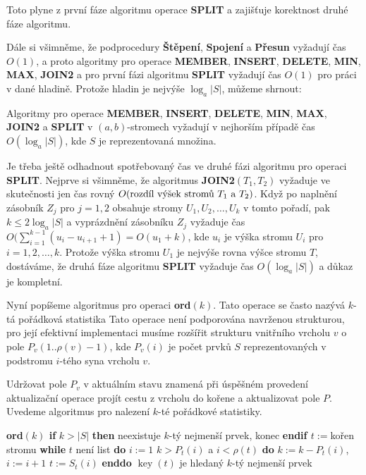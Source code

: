 \documentclass[a4paper,12pt]{article}
\DeclareMathOperator*{\key}{key}
\begin{document}
Toto plyne z první fáze algoritmu operace {\bf SPLIT} a zajišťuje 
korektnost druhé fáze algoritmu. 

Dále si všimněme, že podprocedury {\bf Štěpení}, {\bf Spojení} a {\bf Pře\-sun }
vyžadují čas $O(1)$, a proto algoritmy pro operace {\bf MEMBER}, 
{\bf INSERT}, {\bf DELETE}, {\bf MIN}, {\bf MAX}, {\bf JOIN2} a pro první fázi algoritmu 
{\bf SPLIT} vyžadují čas $O(1)$ pro práci v dané hladině.  Protože 
hladin je nejvýše $\log_a|S|$, můžeme shrnout: 

Algoritmy pro operace {\bf MEMBER}, {\bf INSERT}, 
{\bf DE\-LETE}, {\bf MIN}, {\bf MAX}, {\bf JOIN2} a {\bf SPLIT} v $
(a,b)$-stromech vy\-žadují 
v nejhorším případě čas $O(\log_a|S|)$, kde $
S$ je 
re\-pre\-zen\-tovaná množina.  
\endproclaim

Je třeba ještě odhadnout spotřebovaný čas ve druhé fázi 
algoritmu pro operaci {\bf SPLIT}. Nejprve si všimněme, že 
algoritmus {\bf JOIN2$(T_1,T_2)$} vyžaduje ve skutečnosti jen čas 
rovný 
$O(\text{\rm rozdíl výšek stromů }T_1\text{\rm \ a }
T_2)$. Když po naplnění 
zásobník $Z_j$ pro $j=1,2$ obsahuje stromy $U_1,U_2,\dots,U_
k$ v tomto 
pořadí, pak $k\le 2\log_a|S|$ a vyprázdnění zásobníku $
Z_j$ 
vyžaduje 
čas $O(\sum_{i=1}^{k-1}(u_i-u_{i+1}+1)=O(u_1+k)$, kde $u_i$ je výška stromu $
U_i$ pro 
$i=1,2,\dots,k$. Protože výška stromu $U_1$ je nejvýše rovna výšce 
stromu $T$, dostáváme, že druhá fáze algoritmu {\bf SPLIT} vyžaduje 
čas $O(\log_a|S|)$ a důkaz je kompletní. 

Nyní popíšeme algoritmus pro operaci {\bf ord$
(k)$}. Tato 
operace se často nazývá $k$-tá pořádko\-vá statistika
Tato operace není podporována navrženou 
strukturou, pro její efektivní implementaci musíme 
rozšířit strukturu vnitřního vrcholu $v$ o pole\newline 
$P_v(1..\rho (v)-1)$, kde $P_v(i)$ je počet prvků $S$ reprezentovaných 
v podstromu $i$-tého syna vrcholu $v$.

 

Udržovat pole $P_v$ v aktuálním stavu znamená při úspěšném 
pro\-vedení aktualizační operace projít cestu z vrcholu do koře\-ne 
a aktualizovat pole $P$. Uvedeme algoritmus pro 
naleze\-ní $k$-té pořádkové statistiky.

{\bf ord$(k)$\newline 
if} $k>|S|$ {\bf then} neexistuje $k$-tý nejmenší prvek, konec 
{\bf endif\newline 
$t:=$}kořen stromu\newline 
{\bf while} $t$ není list {\bf do}\newline 
\phantom{---}$i:=1$\newline 
\phantom{---}{\bf while} $k>P_t(i)$ a $i<\rho (t)$ {\bf do}\newline 
\phantom{------}$k:=k-P_t(i)$, $i:=i+1$\newline 
\phantom{---}{\bf enddo}\newline 
\phantom{---}$t:=S_t(i)$\newline 
{\bf enddo}\newline 
$\key(t)$ je hledaný $k$-tý nejmenší prvek
\end{document}
